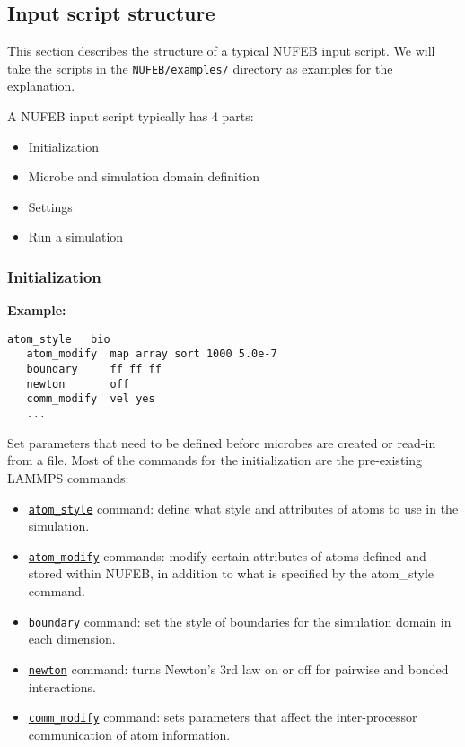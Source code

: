 \documentclass[11pt,a4paper,openright]{article}
\begin{document}
\subsection{Input script structure}

This section describes the structure of a typical NUFEB input script. 
We will take the scripts in  the {\tt NUFEB/examples/} directory as examples for the explanation. 

A NUFEB input script typically has 4 parts:\\

\begin{itemize} [nosep]
    \item Initialization
    \item Microbe and simulation domain definition
    \item Settings
    \item Run a simulation
\end{itemize} 

\subsubsection{Initialization}
\textbf{Example:}
\begin{Verbatim}[frame=single]
   atom_style   bio
   atom_modify  map array sort 1000 5.0e-7
   boundary     ff ff ff
   newton       off
   comm_modify  vel yes
   ...
\end{Verbatim}

Set parameters that need to be defined before microbes are created or read-in from a file. 
Most of the commands for the initialization are the pre-existing LAMMPS commands: \\
\begin{itemize} [nosep]
    \item \hyperref[atomstyle]{\tt atom\_style} command: define what style and attributes of atoms to use in the simulation. 
    \item \href{http://lammps.sandia.gov/doc/atom_style.html}{\tt atom\_modify} commands: modify certain attributes of atoms defined and stored within NUFEB, in addition to what is specified by the atom\_style command. 
    \item \href{http://lammps.sandia.gov/doc/boundary.html}{\tt boundary} command: set the style of boundaries for the simulation domain in each dimension. 
    \item \href{http://lammps.sandia.gov/doc/newton.html}{\tt newton} command: turns Newton's 3rd law on or off for pairwise and bonded interactions. 
    \item \href{http://lammps.sandia.gov/doc/comm_modify.html}{\tt comm\_modify} command: sets parameters that affect the inter-processor communication of atom information.\\
\end{itemize} 
\end{document}
